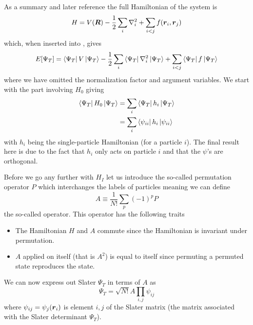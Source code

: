         As a summary and later reference the full Hamiltonian of the system is
            \begin{equation}
                H = V(\boldsymbol{{R}}) - \frac{1}{2}\sum_i\nabla^2_i + \sum\limits_{i<j} f(\boldsymbol{{r}}_i, \boldsymbol{{r}}_j)
            \end{equation}
        which, when inserted into , gives
            \begin{equation}
                E[\Psi_T] = \bra{\Psi_T}V\ket{\Psi_T} -
                \frac{1}{2}\sum_i\bra{\Psi_T}\nabla^2_i\ket{\Psi_T} +
                \sum\limits_{i<j}\bra{\Psi_T}f\ket{\Psi_T}
            \end{equation}
        where we have omitted the normalization factor and argument variables.
        We start with the part involving $H_0$ giving
            \begin{align}
                \bra{\Psi_T}H_0\ket{\Psi_T} &= \sum_{i}\bra{\Psi_T}h_i\ket{\Psi_T} \nonumber
                \\
                &= \sum_i\bra{\psi_{ii}}h_i\ket{\psi_{ii}} 
            \end{align}
        with $h_i$ being the single-particle Hamiltonian (for a particle $i$).
        The final result here is due to the fact that $h_i$ only acts on
        particle $i$ and that the $\psi$'s are orthogonal.

        Before we go any further with $H_I$ let us introduce the so-called
        permutation operator $P$ which interchanges the labels of particles
        meaning we can define
            \begin{equation}
                A \equiv \frac{1}{N!}\sum_p(-1)^pP
            \end{equation}
        the so-called  operator. This operator has
        the following traits
            \begin{itemize}
                \item The Hamiltonian $H$ and $A$ commute since the Hamiltonian
                    is invariant under permutation.
                \item $A$ applied on itself (that is $A^2$) is equal to itself
                    since permuting a permuted state reproduces the state.
            \end{itemize}
        We can now express out Slater $\Psi_T$ in terms of $A$ as
            \begin{equation}
                \Psi_T = \sqrt{N!}A\prod_{i,j}\psi_{ij}
            \end{equation}
        where $\psi_{ij}=\psi_j(\boldsymbol{{r}}_i)$ is element $i,j$ of the Slater
        matrix (the matrix associated with the Slater determinant $\Psi_T$).

